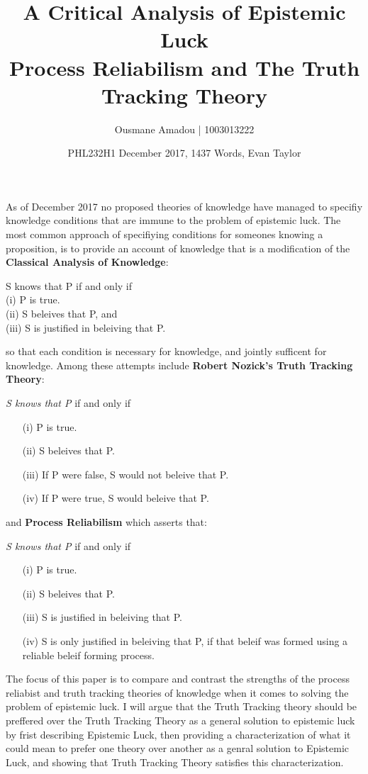 \documentclass{article}
\title{%
  A Critical Analysis of Epistemic Luck \\
  \large Process Reliabilism and The Truth Tracking Theory }
\author{Ousmane Amadou | 1003013222}
\date{PHL232H1 December 2017, 1437 Words, Evan Taylor}
\begin{document}
\maketitle

As of December 2017 no proposed theories of knowledge have managed
to specifiy knowledge conditions that are immune to the problem of
epistemic luck. %
The most common approach of specifiying conditions for someones knowing
a proposition, is to provide an account of knowledge that is a modification
of the \textbf{Classical Analysis of Knowledge}:
\begin{displayquote} %
   S knows that P if and only if \\
  (i) P is true. \\
  (ii) S beleives that P, and \\
  (iii) S is justified in beleiving that P.
\end{displayquote} so that each condition is necessary for knowledge, and jointly
sufficent for knowledge. Among these attempts include \textbf{Robert Nozick's Truth Tracking Theory}:
\begin{displayquote}
  \textit{S knows that P} if and only if
  \begin{enumerate}
      \item[(i)] P is true.
      \item[(ii)] S beleives that P.
      \item[(iii)] If P were false, S would not beleive that P.
      \item[(iv)] If P were true, S would beleive that P.
  \end{enumerate}
\end{displayquote}
and  \textbf{Process Reliabilism} which asserts that:
\begin{displayquote}
  \textit{S knows that P} if and only if
  \begin{enumerate}
      \item[(i)] P is true.
      \item[(ii)] S beleives that P.
      \item[(iii)] S is justified in beleiving that P.
      \item[(iv)] S is only justified in beleiving that P, if that beleif
      was formed using a reliable beleif forming process.
  \end{enumerate}
\end{displayquote}
The focus of this paper is to compare and contrast the strengths of the process
reliabist and truth tracking theories of knowledge when it comes to solving the
problem of epistemic luck. I will argue that the Truth Tracking theory should be
preffered over the Truth Tracking Theory as a general solution to epistemic luck by
frist describing Epistemic Luck, then providing a characterization of what it could
mean to prefer one theory over another as a genral solution to Epistemic Luck, and
showing that Truth Tracking Theory satisfies this characterization.
\end{document}
